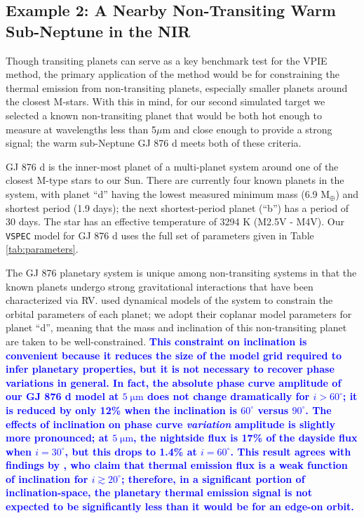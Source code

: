 \documentclass[twocolumn,linenumbers]{aastex7}
\newcommand{\update}[1]{\textcolor{blue}{\bf #1}}
\begin{document}
\subsection{Example 2: A Nearby Non-Transiting Warm Sub-Neptune in the NIR} \label{subsec:gj876}
Though transiting planets can serve as a key benchmark test for the VPIE method, the primary application of the method would be for constraining the thermal emission from non-transiting planets, especially smaller planets around the closest M-stars.  With this in mind, for our second simulated target we selected a known non-transiting planet that would be both hot enough to measure at wavelengths less than 5$\mu$m and close enough to provide a strong signal; the warm sub-Neptune GJ 876 d meets both of these criteria. 

GJ 876 d is the inner-most planet of a multi-planet system around one of the closest M-type stars to our Sun. There are currently four known planets in the system, with planet ``d'' having the lowest measured minimum mass (6.9 M$_\oplus$) and shortest period (1.9 days); the next shortest-period planet (``b'') has a period of 30 days.  The star has an effective temperature of 3294 K (M2.5V - M4V).  Our \texttt{VSPEC} model for GJ 876 d uses the full set of parameters given in Table \ref{tab:parameters}.

The GJ 876 planetary system is unique among non-transiting systems in that the known planets undergo strong gravitational interactions that have been characterized via RV. \citet{nelson2016} used dynamical models of the system to constrain the orbital parameters of each planet; we adopt their coplanar model parameters for planet ``d'', meaning that the mass and inclination of this non-transiting planet are taken to be well-constrained. \update{This constraint on inclination is convenient because it reduces the size of the model grid required to infer planetary properties, but it is not necessary to recover phase variations in general. In fact, the absolute phase curve amplitude of our GJ 876 d model at $5\;\mathrm{\mu m}$ does not change dramatically for $i>60^\circ$; it is reduced by only 12\% when the inclination is $60^\circ$ versus $90^\circ$. The effects of inclination on phase curve {\em variation} amplitude is slightly more pronounced; at $5\;\mathrm{\mu m}$, the nightside flux is 17\% of the dayside flux when $i=30^\circ$, but this drops to 1.4\% at $i=60^\circ$. This result agrees with findings by \citet[see their Section 4.8]{selsis2011}, who claim that thermal emission flux is a weak function of inclination for $i\gtrsim20^\circ$; therefore, in a significant portion of inclination-space, the planetary thermal emission signal is not expected to be significantly less than it would be for an edge-on orbit.}
\end{document}

